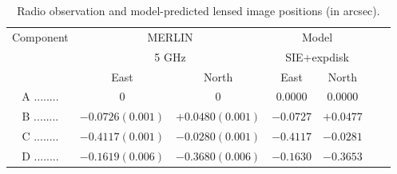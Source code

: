\documentclass[useAMS,usenatbib]{mn2e}
\begin{document}



\begin{table}
\centering
 \begin{minipage}{140mm}
  \caption{Radio observation \citep{Marlow99} and model-predicted lensed image positions (in arcsec).}
  \begin{tabular}{@{}ccccccc}
\hline

Component	&\multicolumn{2}{c}{MERLIN} 	 & \multicolumn{2}{c}{Model} \\
					&\multicolumn{2}{c}{5 GHz}		&	\multicolumn{2}{c}{SIE+expdisk} 	\\
					 &East &North &East 		&North \\ 
\hline
A ........ &$0$    		&$0$		&$0.0000$ &$0.0000$   \\  
B ........ &$-0.0726(0.001)$ 	&$+0.0480(0.001)$	&$-0.0727$ &$+0.0477$  \\  
C ........ &$-0.4117(0.001)$  &$-0.0280(0.001)$	&$-0.4117$ &$-0.0281$   \\  
D ........ &$-0.1619(0.006)$  &$-0.3680(0.006)$	&$-0.1630$ &$-0.3653$  \\  
\hline
\end{tabular}

\end{minipage}
\medskip
\end{table}
\end{document}
